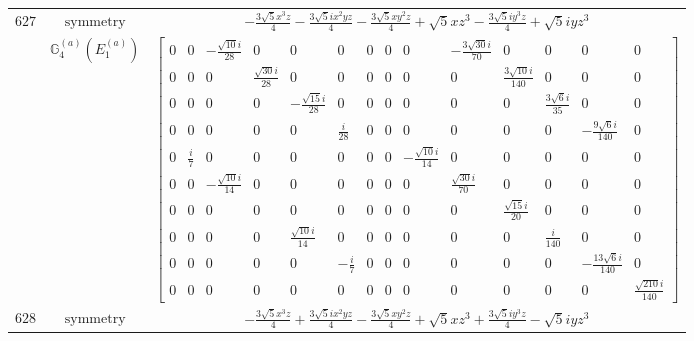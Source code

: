 \documentclass[fleqn,8pt,landscape]{jsarticle}
\begin{document}
\begin{longtable}{ccc}
$ 627 $ & $ \text{symmetry} $ & $ - \frac{3 \sqrt{5} x^{3} z}{4} - \frac{3 \sqrt{5} i x^{2} y z}{4} - \frac{3 \sqrt{5} x y^{2} z}{4} + \sqrt{5} x z^{3} - \frac{3 \sqrt{5} i y^{3} z}{4} + \sqrt{5} i y z^{3} $ \\
$  $ & $ \mathbb{G}_{4}^{(a)}(E_{1}^{(a)}) $ & $ \begin{bmatrix} 0 & 0 & - \frac{\sqrt{10} i}{28} & 0 & 0 & 0 & 0 & 0 & 0 & - \frac{3 \sqrt{30} i}{70} & 0 & 0 & 0 & 0 \\ 0 & 0 & 0 & \frac{\sqrt{30} i}{28} & 0 & 0 & 0 & 0 & 0 & 0 & \frac{3 \sqrt{10} i}{140} & 0 & 0 & 0 \\ 0 & 0 & 0 & 0 & - \frac{\sqrt{15} i}{28} & 0 & 0 & 0 & 0 & 0 & 0 & \frac{3 \sqrt{6} i}{35} & 0 & 0 \\ 0 & 0 & 0 & 0 & 0 & \frac{i}{28} & 0 & 0 & 0 & 0 & 0 & 0 & - \frac{9 \sqrt{6} i}{140} & 0 \\ 0 & \frac{i}{7} & 0 & 0 & 0 & 0 & 0 & 0 & - \frac{\sqrt{10} i}{14} & 0 & 0 & 0 & 0 & 0 \\ 0 & 0 & - \frac{\sqrt{10} i}{14} & 0 & 0 & 0 & 0 & 0 & 0 & \frac{\sqrt{30} i}{70} & 0 & 0 & 0 & 0 \\ 0 & 0 & 0 & 0 & 0 & 0 & 0 & 0 & 0 & 0 & \frac{\sqrt{15} i}{20} & 0 & 0 & 0 \\ 0 & 0 & 0 & 0 & \frac{\sqrt{10} i}{14} & 0 & 0 & 0 & 0 & 0 & 0 & \frac{i}{140} & 0 & 0 \\ 0 & 0 & 0 & 0 & 0 & - \frac{i}{7} & 0 & 0 & 0 & 0 & 0 & 0 & - \frac{13 \sqrt{6} i}{140} & 0 \\ 0 & 0 & 0 & 0 & 0 & 0 & 0 & 0 & 0 & 0 & 0 & 0 & 0 & \frac{\sqrt{210} i}{140} \end{bmatrix} $ \\ \hline
$ 628 $ & $ \text{symmetry} $ & $ - \frac{3 \sqrt{5} x^{3} z}{4} + \frac{3 \sqrt{5} i x^{2} y z}{4} - \frac{3 \sqrt{5} x y^{2} z}{4} + \sqrt{5} x z^{3} + \frac{3 \sqrt{5} i y^{3} z}{4} - \sqrt{5} i y z^{3} $ \\

\end{longtable}
\end{document}
